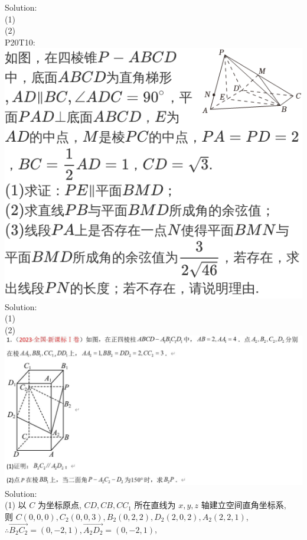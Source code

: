 \documentclass[a4paper,11pt,UTF8]{article}
\begin{document}
Solution:\\
(1)\\
(2)\\
P20T10:\\
\includegraphics[scale=0.5]{./P20T10.jpg}\\
Solution:\\
(1)\\
(2)\\
\includegraphics[scale=0.5]{./2023_new1.jpg}\\
Solution:\\
(1) 以 $C$ 为坐标原点, $C D, C B, C C_1$ 所在直线为 $x, y, z$ 轴建立空间直角坐标系,\\
则 $C(0,0,0), C_2(0,0,3), B_2(0,2,2), D_2(2,0,2), A_2(2,2,1)$,\\
$\therefore \overrightarrow{B_2 C_2}=(0,-2,1), \overrightarrow{A_2 D_2}=(0,-2,1)$,\\
\end{document}
